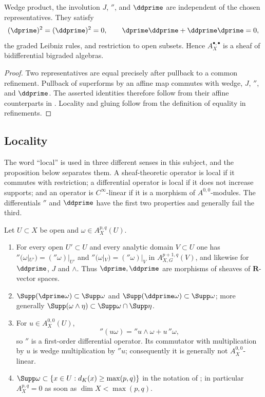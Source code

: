 \begin{proposition}\label{prop:cld-intrinsic-calculus}
Wedge product, the involution $J$, $\dprime$, and $\ddprime$ are independent
of the chosen representatives.  They satisfy
\[
 (\dprime)^2=(\ddprime)^2=0,
 \qquad \dprime\ddprime+\ddprime\dprime=0,
\]
the graded Leibniz rules, and restriction to open subsets.  Hence
$A_X^{\bullet,\bullet}$ is a sheaf of bidifferential bigraded algebras.
\end{proposition}
\begin{proof}
Two representatives are equal precisely after pullback to a common
refinement.  Pullback of superforms by an affine map commutes with wedge,
$J$, $\dprime$, and $\ddprime$.  The asserted identities therefore follow
from their affine counterparts in .  Locality
and gluing follow from the definition of equality in refinements.
\end{proof}

\subsection{Locality}
\label{sec:ch13-locality}

The word ``local'' is used in three different senses in this subject, and the
proposition below separates them.  A sheaf-theoretic operator is local if it
commutes with restriction; a differential operator is local if it does not
increase supports; and an operator is $C^\infty$-linear if it is a
morphism of $A^{0,0}$-modules.  The differentials $\dprime$ and $\ddprime$
have the first two properties and generally fail the third.

\begin{proposition}
\label{prop:ch13-locality}
Let $U\subset X$ be open and $\omega\in A^{p,q}_X(U)$.
\begin{enumerate}
\item\label{itm:ch13-loc:restrict} For every open $U'\subset U$ and every
  analytic domain $V\subset U$ one has
  $\dprime(\omega|_{U'})=(\dprime\omega)|_{U'}$ and
  $\dprime(\omega|_{V})=(\dprime\omega)|_{V}$ in $A^{p+1,q}_{X,G}(V)$, and
  likewise for $\ddprime$, $J$ and $\wedge$.  Thus $\dprime,\ddprime$ are
  morphisms of sheaves of $\mathbf R$-vector spaces.
\item\label{itm:ch13-loc:support} $\Supp(\dprime\omega)\subset\Supp\omega$
  and $\Supp(\ddprime\omega)\subset\Supp\omega$; more generally
  $\Supp(\omega\wedge\eta)\subset\Supp\omega\cap\Supp\eta$.
\item\label{itm:ch13-loc:leibniz} For $u\in A^{0,0}_X(U)$,
  \[
   \dprime(u\omega)=\dprime u\wedge\omega+u\,\dprime\omega,
  \]
  so $\dprime$ is a first-order differential operator.  Its commutator
  with multiplication by $u$ is wedge multiplication by $\dprime u$;
  consequently it is generally not $A^{0,0}_X$-linear.
\item\label{itm:ch13-loc:dim} $\Supp\omega\subset\{x\in U:d_K(x)\ge\max(p,q)\}$
  in the notation of ; in particular
  $A^{p,q}_X=0$ as soon as $\dim X<\max(p,q)$.
\end{enumerate}
\end{proposition}

